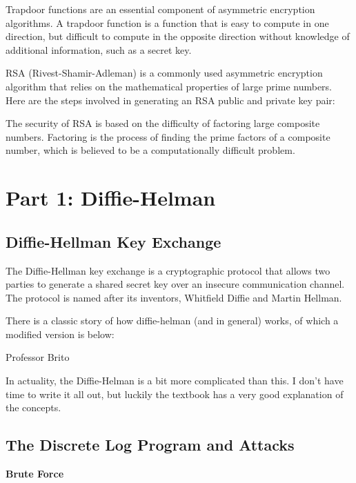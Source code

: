\documentclass{article}
\begin{document}
Trapdoor functions are an essential component of asymmetric encryption algorithms. A trapdoor function is a function that is easy to compute in one direction, but difficult to compute in the opposite direction without knowledge of additional information, such as a secret key.

RSA (Rivest-Shamir-Adleman) is a commonly used asymmetric encryption algorithm that relies on the mathematical properties of large prime numbers. Here are the steps involved in generating an RSA public and private key pair:

The security of RSA is based on the difficulty of factoring large composite numbers. Factoring is the process of finding the prime factors of a composite number, which is believed to be a computationally difficult problem.

\section*{Part 1: Diffie-Helman}

\subsection*{Diffie-Hellman Key Exchange}

The Diffie-Hellman key exchange is a cryptographic protocol that allows two parties to generate a shared secret key over an insecure communication channel. The protocol is named after its inventors, Whitfield Diffie and Martin Hellman.

There is a classic story of how diffie-helman (and in general) works, of which a modified version is below:

\begin{tcolorbox}
    Professor Brito
\end{tcolorbox}

In actuality, the Diffie-Helman is a bit more complicated than this. I don't have time to write it all out, but luckily the textbook has a very good explanation of the concepts.

\subsection{The Discrete Log Program and Attacks}



\begin{center}
    \textbf{Brute Force}
\end{center}
\end{document}
